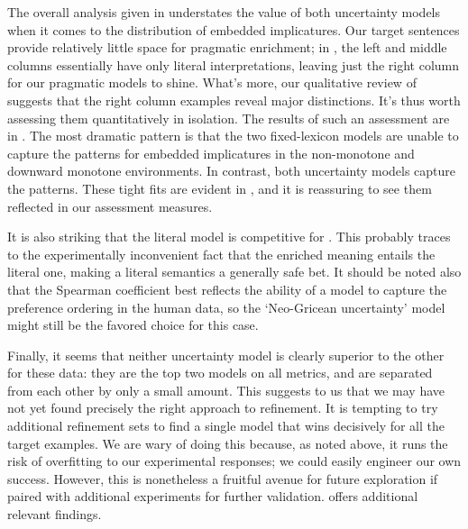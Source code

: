 \documentclass[leqno,12pt]{article}
\begin{document}
The overall analysis given in  understates the
value of both uncertainty models when it comes to the distribution of
embedded implicatures. Our target sentences provide relatively little
space for pragmatic enrichment; in , the left
and middle columns essentially have only literal interpretations,
leaving just the right column for our pragmatic models to
shine. What's more, our qualitative review of
 suggests that the right column examples
reveal major distinctions. It's thus worth assessing them
quantitatively in isolation. The results of such an assessment are in
.  The most dramatic pattern is that the two
fixed-lexicon models are unable to capture the patterns for embedded
implicatures in the non-monotone and downward monotone
environments. In contrast, both uncertainty models capture the
patterns. These tight fits are evident in ,
and it is reassuring to see them reflected in our assessment measures.

It is also striking that the literal model is competitive for
. This probably traces to the experimentally
inconvenient fact that the enriched meaning entails the literal one,
making a literal semantics a generally safe bet. It should be noted
also that the Spearman coefficient best reflects the ability of a
model to capture the preference ordering in the human data, so the
`Neo-Gricean uncertainty' model might still be the favored choice for
this case.

Finally, it seems that neither uncertainty model is clearly superior
to the other for these data: they are the top two models on all
metrics, and are separated from each other by only a small amount.
This suggests to us that we may have not yet found precisely the right
approach to refinement. It is tempting to try additional refinement
sets to find a single model that wins decisively for all the target
examples. We are wary of doing this because, as noted above, it runs
the risk of overfitting to our experimental responses; we could easily
engineer our own success.  However, this is nonetheless a fruitful
avenue for future exploration if paired with additional experiments
for further validation.  offers
additional relevant findings.
\end{document}
